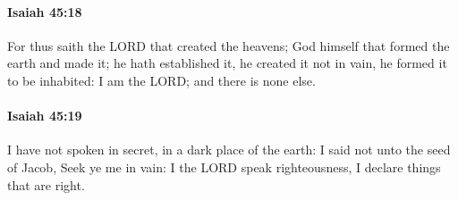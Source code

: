 		\paragraph{Isaiah 45:18} %
			\label{ISAIAH-45-18}

			For thus saith the LORD that created the heavens; God himself that formed the earth and made it; he hath established it, he created it not in vain, he formed it to be inhabited: I am the LORD; and there is none else.


		\paragraph{Isaiah 45:19} %
			\label{ISAIAH-45-19}

			I have not spoken in secret, in a dark place of the earth: I said not unto the seed of Jacob, Seek ye me in vain: I the LORD speak righteousness, I declare things that are right.

